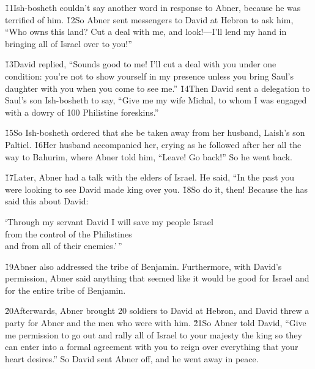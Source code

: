 \v{11}Ish-bosheth couldn't say another word in response to Abner, because he was terrified of him. \v{12}So Abner sent messengers to David at Hebron to ask him, ``Who owns this land? Cut a deal with me, and look!---I'll lend my hand in bringing all of Israel over to you!''

\v{13}David replied, ``Sounds good to me! I'll cut a deal with you under one condition: you're not to show yourself in my presence unless you bring Saul's daughter with you when you come to see me.'' \v{14}Then David sent a delegation to Saul's son Ish-bosheth to say, ``Give me my wife Michal, to whom I was engaged with a dowry of 100 Philistine foreskins.''

\v{15}So Ish-bosheth ordered that she be taken away from her husband, Laish's son Paltiel. \v{16}Her husband accompanied her, crying as he followed after her all the way to Bahurim, where Abner told him, ``Leave! Go back!'' So he went back.

\v{17}Later, Abner had a talk with the elders of Israel. He said, ``In the past you were looking to see David made king over you. \v{18}So do it, then! Because the  has said this about David:

\begin{poetry}
\poeml `Through my servant David I will save my people Israel \\
\poemll    from the control of the Philistines \\
\poemlll       and from all of their enemies.'\,''
\end{poetry}

\v{19}Abner also addressed the tribe of Benjamin. Furthermore, with David's permission, Abner said anything that seemed like it would be good for Israel and for the entire tribe of Benjamin.

\v{20}Afterwards, Abner brought 20 soldiers to David at Hebron, and David threw a party for Abner and the men who were with him. \v{21}So Abner told David, ``Give me permission to go out and rally all of Israel to your majesty the king so they can enter into a formal agreement with you to reign over everything that your heart desires.'' So David sent Abner off, and he went away in peace.

